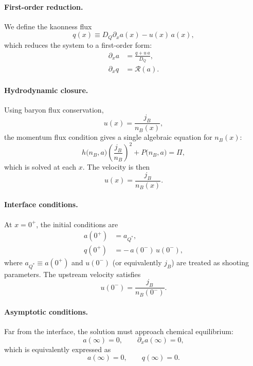 \documentclass[11pt]{article}
\begin{document}
\paragraph{First-order reduction.}
We define the kaonness flux
\begin{equation}
q(x) \equiv D_Q \partial_x a(x) - u(x)\,a(x),
\end{equation}
which reduces the system to a first-order form:
\begin{align}
\partial_x a &= \frac{q + u\,a}{D_Q}, \\
\partial_x q &= \mathcal{R}(a).
\end{align}

\paragraph{Hydrodynamic closure.}
Using baryon flux conservation,
\begin{equation}
u(x) = \frac{j_B}{n_B(x)},
\end{equation}
the momentum flux condition gives a single algebraic equation for $n_B(x)$:
\begin{equation}
h\big(n_B,a\big)\left(\frac{j_B}{n_B}\right)^2 + P\big(n_B,a\big) = \Pi,
\end{equation}
which is solved at each $x$. The velocity is then
\begin{equation}
u(x) = \frac{j_B}{n_B(x)}.
\end{equation}

\paragraph{Interface conditions.}
At $x=0^+$, the initial conditions are
\begin{align}
a(0^+) &= a_{Q^*}, \\
q(0^+) &= -\,a(0^-)\,u(0^-),
\end{align}
where $a_{Q^*} \equiv a(0^+)$ and $u(0^-)$ (or equivalently $j_B$) are treated as shooting parameters. The upstream velocity satisfies
\begin{equation}
u(0^-) = \frac{j_B}{n_B(0^-)}.
\end{equation}

\paragraph{Asymptotic conditions.}
Far from the interface, the solution must approach chemical equilibrium:
\begin{equation}
a(\infty) = 0, \qquad \partial_x a(\infty) = 0,
\end{equation}
which is equivalently expressed as
\begin{equation}
a(\infty) = 0, \qquad q(\infty) = 0.
\end{equation}
\end{document}
